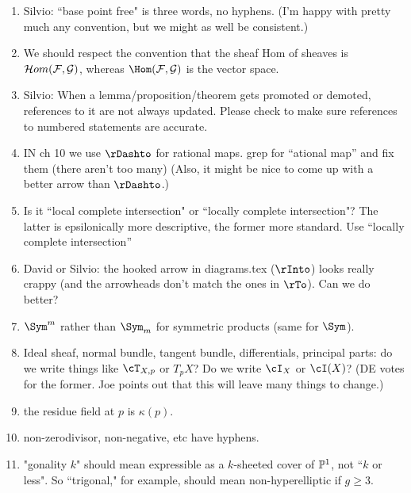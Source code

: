 \documentclass[12pt, leqno]{book}
\begin{document}
\begin{enumerate}
\item Silvio: ``base point free" is three words, no hyphens. (I'm happy with pretty much any convention, but we might as well be consistent.)


\item We should respect the convention that the sheaf Hom of sheaves is
$\cH om(\cF,\cG)$, whereas $\Hom(\cF,\cG)$ is the vector space.

\item Silvio: When a lemma/proposition/theorem gets promoted or demoted, references to it are not always updated. Please check to make sure references to numbered statements are accurate. 


\item IN ch 10 we use $\rDashto$ for rational maps. grep for ``ational map'' and fix them (there aren't too many) (Also, it might be nice to come up with a better arrow than $\rDashto$.)

\item Is it ``local complete intersection" or ``locally complete intersection"? The latter is epsilonically more descriptive, the former more standard. Use ``locally complete intersection''

\item David or Silvio: the hooked arrow in diagrams.tex ($\rInto$) looks really crappy (and the arrowheads don't match the ones in $\rTo$). Can we do better?


\item $\Sym^{m}$ rather than $\Sym_{m}$ for symmetric products (same for $\Sym$).
\item Ideal sheaf, normal bundle, tangent bundle, differentials, principal parts: do we write things like 
$\cT_{X,p}$ or $T_{p}X$? Do we write $\cI_{X}$ or $\cI(X)$? (DE votes for the former. Joe points out that
this will leave many things to change.)

\item the residue field at $p$ is $\kappa(p)$.

\item non-zerodivisor, non-negative, etc have hyphens.

\item "gonality $k$" should mean expressible as a $k$-sheeted cover of $\PP^1$, not ``$k$ or less". So ``trigonal," for example, should mean non-hyperelliptic if $g \geq 3$.

\end{enumerate}
\end{document}
